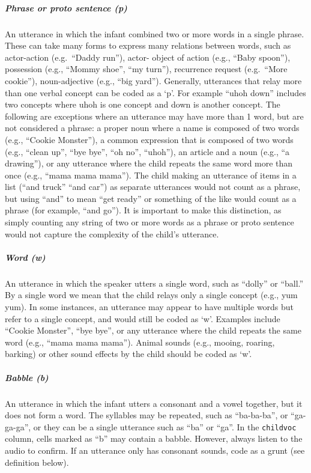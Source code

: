 \documentclass[
]{book}
\begin{document}
\hypertarget{phrase_proto_sentence}{%
\subparagraph*{Phrase or proto sentence (p)}\label{phrase_proto_sentence}}

An utterance in which the infant combined two or more words in a single phrase. These can take many forms to express many relations between words, such as actor-action (e.g.~``Daddy run''), actor- object of action (e.g., ``Baby spoon''), possession (e.g., ``Mommy shoe'', ``my turn''), recurrence request (e.g.~``More cookie''), noun-adjective (e.g., ``big yard''). Generally, utterances that relay more than one verbal concept can be coded as a `p'. For example ``uhoh down'' includes two concepts where uhoh is one concept and down is another concept.
The following are exceptions where an utterance may have more than 1 word, but are not considered a phrase: a proper noun where a name is composed of two words (e.g., ``Cookie Monster''), a common expression that is composed of two words (e.g., ``clean up'', ``bye bye'', ``oh no'', ``uhoh''), an article and a noun (e.g., ``a drawing''), or any utterance where the child repeats the same word more than once (e.g., ``mama mama mama''). The child making an utterance of items in a list (``and truck'' ``and car'') as separate utterances would not count as a phrase, but using ``and'' to mean ``get ready'' or something of the like would count as a phrase (for example, ``and go''). It is important to make this distinction, as simply counting any string of two or more words as a phrase or proto sentence would not capture the complexity of the child's utterance.

\hypertarget{word}{%
\subparagraph*{Word (w)}\label{word}}

An utterance in which the speaker utters a single word, such as ``dolly'' or ``ball.'' By a single word we mean that the child relays only a single concept (e.g., yum yum).
In some instances, an utterance may appear to have multiple words but refer to a single concept, and would still be coded as `w'. Examples include ``Cookie Monster'', ``bye bye'', or any utterance where the child repeats the same word (e.g., ``mama mama mama''). Animal sounds (e.g., mooing, roaring, barking) or other sound effects by the child should be coded as `w'.

\hypertarget{babble}{%
\subparagraph*{Babble (b)}\label{babble}}

An utterance in which the infant utters a consonant and a vowel together, but it does not form a word. The syllables may be repeated, such as ``ba-ba-ba'', or ``ga-ga-ga'', or they can be a single utterance such as ``ba'' or ``ga''. In the \texttt{childvoc} column, cells marked as ``b'' may contain a babble. However, always listen to the audio to confirm.
If an utterance only has consonant sounds, code as a grunt (see definition below).
\end{document}
